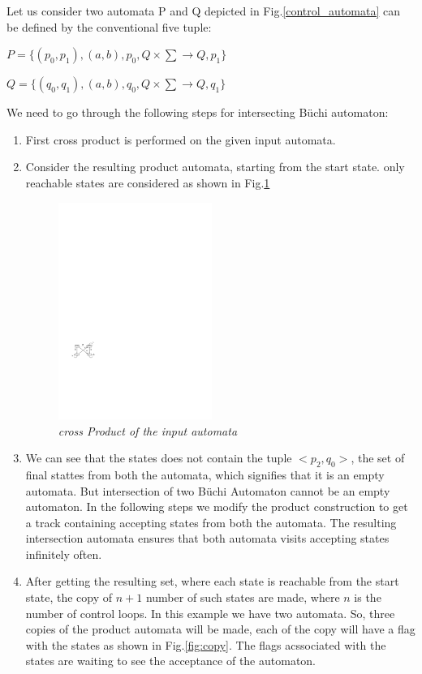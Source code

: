 Let us consider two automata P and Q depicted in Fig.\ref{control_automata} can be defined by the
conventional five tuple:

$P = \{(p_0,p_1),(a,b),p_0, Q \times \sum \rightarrow Q,p_1\}$

$Q = \{(q_0,q_1),(a,b),q_0, Q \times \sum \rightarrow Q,q_1\}$

We need to go through the 
following steps for intersecting B\"{u}chi automaton:
\begin{enumerate}
 \item First cross product is performed on the given input automata.
 
 \item Consider the resulting product automata, starting from the start state. only
 reachable states are considered as shown in Fig.\ref{product}
 
 \begin{figure}
\begin{center}
\includegraphics[width=50mm]{product.pdf}
\end{center}
\caption{{\em cross Product of the input automata}}
\label{product}
\end{figure}

 
 \item We can see that the states does not contain the tuple $<p_2,q_0>$, the set of final stattes
 from both the automata, which signifies 
 that it is an empty automata. But intersection of two B\"{u}chi Automaton cannot be an empty automaton. In
 the following steps we modify the product construction to get a track containing accepting states from
 both the automata. The resulting intersection automata ensures that both automata visits accepting states 
 infinitely often.
 
 \item After getting the resulting set, where each state is reachable from the 
 start state, the copy of $n + 1$ number of such states are made, where $n$ is the number
 of control loops. In this example we have two automata. So, three copies of the product automata will be made,
 each of the copy will have a flag with the states as shown in Fig.\ref{fig:copy}. The flags acssociated with 
 the states are waiting to see the acceptance of the automaton.
 

\end{enumerate}
